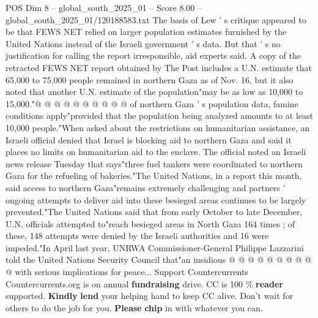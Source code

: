 \begin{textsample}{POS Dim 8 – global\_south\_2025\_01 – Score 8.00 – global\_south\_2025\_01/120188583.txt}
The basis of Lew ' s critique appeared to be that FEWS NET relied on larger population estimates furnished by the United Nations instead of the Israeli government ' s data.
But that ' s no justification for calling the report irresponsible, aid experts said.
A copy of the retracted FEWS NET report obtained by The Post includes a U.N. estimate that 65,000 to 75,000 people remained in northern Gaza as of Nov. 16, but it also noted that another U.N. estimate of the population"may be as low as 10,000 to 15,000."@ @ @ @ @ @ @ @ @ @ of northern Gaza ' s population data, famine conditions apply"provided that the population being analyzed amounts to at least 10,000 people."When asked about the restrictions on humanitarian assistance, an Israeli official denied that Israel is blocking aid to northern Gaza and said it places no limits on humanitarian aid to the enclave.
The official noted an Israeli news release Tuesday that says"three fuel tankers were coordinated to northern Gaza for the refueling of bakeries."The United Nations, in a report this month, said access to northern Gaza"remains extremely challenging and partners ' ongoing attempts to deliver aid into these besieged areas continues to be largely prevented."The United Nations said that from early October to late December, U.N. officials attempted to"reach besieged areas in North Gaza 164 times ; of these, 148 attempts were denied by the Israeli authorities and 16 were impeded."In April last year, UNRWA Commissioner-General Philippe Lazzarini told the United Nations Security Council that"an insidious @ @ @ @ @ @ @ @ @ @ with serious implications for peace...
Support Countercurrents Countercurrents.org is on annual \textbf{fundraising} drive.
CC is 100 \% \textbf{reader} supported. \textbf{Kindly} \textbf{lend} your helping hand to keep CC alive.
Don't wait for others to do the job for you. \textbf{Please} \textbf{chip} in with whatever you can.

\end{textsample}
